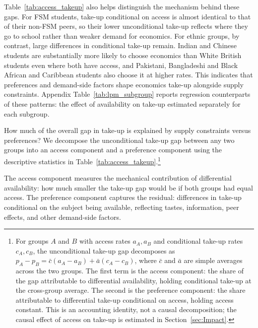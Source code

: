 Table~\ref{tab:access_takeup} also helps distinguish the mechanism behind these gaps. For FSM students, take-up conditional on access is almost identical to that of their non-FSM peers, so their lower unconditional take-up reflects where they go to school rather than weaker demand for economics. For ethnic groups, by contrast, large differences in conditional take-up remain. Indian and Chinese students are substantially more likely to choose economics than White British students even where both have access, and Pakistani, Bangladeshi and Black African and Caribbean students also choose it at higher rates. This indicates that preferences and demand-side factors shape economics take-up alongside supply constraints. Appendix Table~\ref{tab:lpm_subgroup} reports regression counterparts of these patterns: the effect of availability on take-up estimated separately for each subgroup.



How much of the overall gap in take-up is explained by supply constraints versus preferences? We decompose the unconditional take-up gap between any two groups into an access component and a preference component using the descriptive statistics in Table~\ref{tab:access_takeup}.\footnote{For groups $A$ and $B$ with access rates $a_A, a_B$ and conditional take-up rates $c_A,c_B$, the unconditional take-up gap decomposes as $p_A - p_B = \bar{c}(a_A - a_B) + \bar{a}(c_A - c_B)$, where $\bar{c}$ and $\bar{a}$ are simple averages across the two groups. The first term is the access component: the share of the gap attributable to differential availability, holding conditional take-up at the cross-group average. The second is the preference component: the share attributable to differential take-up conditional on access, holding access constant. This is an accounting identity, not a causal decomposition; the causal effect of access on take-up is estimated in Section~\ref{sec:Impact}.}

The access component measures the mechanical contribution of differential availability: how much smaller the take-up gap would be if both groups had equal access. The preference component captures the residual: differences in take-up conditional on the subject being available, reflecting tastes, information, peer effects, and other demand-side factors.


